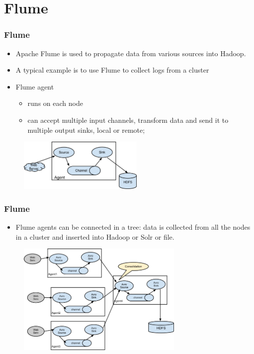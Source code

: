 \documentclass{beamer}
\begin{document}
\section{Flume}
\begin{frame}
 \frametitle{Flume}
 \begin{itemize}
  \item Apache Flume is used to propagate data from various sources into Hadoop.
  \item A typical example is to use Flume to collect logs from a cluster
  \item Flume agent
    \begin{itemize}
      \item runs on each node
      \item can accept multiple input channels, transform data and send it to multiple output sinks, local or remote;
    \end{itemize}
 \end{itemize}

 \begin{figure}[h]
 \includegraphics[width=6cm]{graphs/DevGuide_image00.png}
 \end{figure}
 
\end{frame}


\begin{frame}[fragile]
 \frametitle{Flume}
 \begin{itemize}
  \item Flume agents can be connected in a tree: data is collected from all the nodes in a cluster and inserted into Hadoop or Solr or file.
 \end{itemize}

 \begin{figure}[h]
 \includegraphics[width=8cm]{graphs/UserGuide_image02.png}
 \end{figure}
\end{frame}
\end{document}
